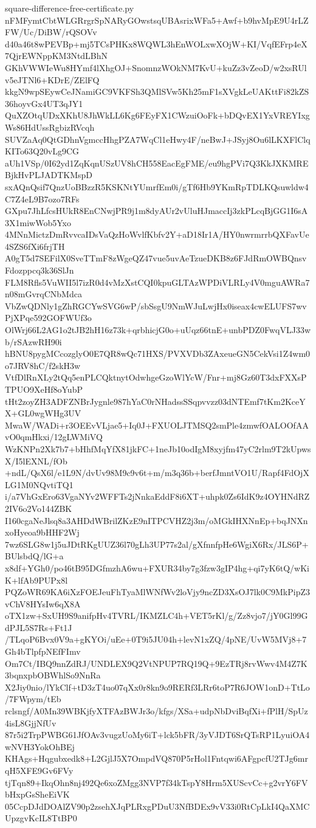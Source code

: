 \documentclass[11pt]{article}
\theoremstyle{definition}
\theoremstyle{remark}
\begin{document}
\begin{filecontents*}[overwrite]{square-difference-free-certificate.py}
nFMFymtCbtWLGRrgrSpNARyGOwstsqUBAsrixWFa5+Awf+b9hvMpE9U4rLZFW/Uc/DiBW/rQSOVv
d40a46t8wPEVBp+mj5TCsPHKx8WQWL3hEnWOLxwXOjW+KI/VqfEFrp4eX7QjrEWNppKM3NtdLBhN
GKhVWWIeWu8HYmf4lXhgOJ+SnomnzWOkNM7KvU+kuZz3vZeoD/w2xsRUlv5eJTNl6+KDrE/ZElFQ
kkgN9wpSEywCeJNamiGC9VKFSh3QMlSVw5Kh25mF1sXVgkLeUAKttFi82kZS36hoyvGx4UT3qJY1
QuXZOtqUDxXKhU8JhWkLL6Kg6FEyFX1CWzuiOoFk+bDQvEX1YxVREYIxgWs86HdUssRgbizRVcqh
SUVZaAq0QtGDhnVgmccHhgPZA7WqCl1eHwy4F/neBwJ+JSyj8Ou6lLKXFlClqKITo63Q20vLg9CG
aUh1VSp/0I62yd1ZqKqnUSzUV8hCH558EacEgFME/eu9hgPVi7Q3KkJXKMREBjkHvPLJADTKMspD
sxAQnQsif7QnzUoBBzzR5KSKNtYUmrfEm0i/gTf6Hb9YKmRpTDLKQsuwldw4C7Z4eL9B7ozo7RFs
GXpu7JhLfcsHUkR8EnCNwjPR9j1m8dyAUr2vUluHJmaccIj3zkPLcqBjGG1I6sA3X1miwWob5Yxo
4MNnMictzDmRvvcaIDsVaQzHoWvlfKbfv2Y+aD18Ir1A/HY0nwrmrrbQXFavUe4SZS6fXi6frjTH
A0gT5d7SEFilX0SveTTmF8zWgeQZ47vue5uvAeTzueDKB8z6FJdRmOWBQnsvFdozppcq3k36SlJn
FLM8Rfls5VuWII5l7izR0d4vMzXstCQI0kpuGLTAzWPDiVLRLy4V0mguAWRa7n08mGvrqCNbMdca
VbZwQDNly1gZhRGCYwSVG6wP/sbSsgU9NmWJuLwjHx0iseax4cwELUFS7wvPjXPqe592GOFWUf3o
OlWrj66L2AG1o2tJB2hH16z73k+qrbhicjG0o+uUqz66tnE+unbPDZ0FwqVLJ33wb/rSAzwRH90i
hBNU8pygMCcozglyO0E7QR8wQc71HXS/PVXVDb3ZAxeueGN5CekVsi1Z4wm0o7JRV8hC/f2skH3w
VtfDlRnXLy2tQq5enPLCQktnytOdwhgeGzoWlYcW/Fnr+mj8Gz60T3dxFXXsPTPUO9XeHf8oYubP
tHt2zoyZH3ADFZNBrJygnle987hYaC0rNHadssSSqpvvzz03dNTEmf7tKm2KceYX+GL0wgWHg3UV
MwaW/WADi+r3OEEvVLjae5+Iq0J+FXUOLJTMSQ2smPle4zmwfOALOOfAAvO0qmHkxi/12gLWMiVQ
WzKNPn2Xk7b7+bHhfMqYfX81jkFC+1neJb10odIgM8xyjfm47yC2rlm9T2kUpwsX/I5lEXNL/fOb
+ndL/QsX6l/e1L9N/dvUv98M9c9v6t+m/m3q36b+berfJmntVO1U/Rapf4FdOjXLG1M0NQvtiTQ1
i/a7VhGxEro63VgaNYv2WFFTs2jNnkaEddF8i6XT+uhpk0Zs6IdK9z4OYHNdRZ2IV6o2Vo144ZBK
I160cgaNeJlsq8a3AHDdWBrilZKzE9nITPCVHZ2j3m/oMGkIHXNnEp+bqJNXnxoHyeoa9bHHF2Wj
7wz6SLG8w1j5uJDtRKgUUZ36l70gLh3UP77s2al/gXfnnfpHe6WgiX6Rx/JLS6P+BUlsbdQ/lG+a
x8df+YGh0/po46tB95DGfmzhA6wu+FXUR34by7g3fzw3gIP4hg+qi7yK6tQ/wKiK+lfAb9PUPx8l
PQZoWR69KA6iXzFOEJeuFhTyaMlWNfWv2loVjy9ncZD3XsOJ7lk0C9MkPipZ3vChV8HYsIw6qX8A
oTX1zw+SxUH9S9anifpHv4TVRL/IKMZLC4h+VET5rKl/g/Zz8vjo7/jY0Gl99GdPJL5S7Rs+Ft1J
/TLqoP6Bvx0V9a+gKYOi/uEe+0T9i5JU04h+levN1xZQ/4pNE/UvW5MVj8+7Gh4bTlpfpNEfFImv
Om7Ct/IBQ9nnZdRJ/UNDLEX9Q2VtNPUP7RQ19Q+9EzTRj8rvWwv4M4Z7K3bqnxpbOBWhlSo9NnRa
X2Jiy0nio/lYkClf+tD3zT4uo07qXx0r8kn9o9RERf3LRr6toP7R6JOW1onD+TtLo/7FWpym/tEb
rclsngf/A0Mn39WBKjfyXTFAzBWJr3o/kfgs/XSa+udpNbDviBqfXi+fPlH/SpUz4isL8GjjNfUv
87r5i2TrpPWBG61JfOAv3vugzUoMy6iT+lck5bFR/3yVJDT6SrQTsRP1LyuiOA4wNVH3YokOhBEj
KHAgs+Hqgubxedk8+L2GjlJ5X7OmpdVQ870P5rHol1Fntqwi6AFgpcfU2TJg6mrqH5XFE9Gv6FVy
tjTqn89+IkqOhn8nj492Qe6xoZMgg3NVP7f34kTspY8Hrm5XUScvCc+g2vrY6FVbHxpGsSheEiVK
05CcpDJdDOAlZV90p2zsehXJqPLRxgPDuU3NfBDEx9vV33i0RtCpLkI4QaXMCUpzgvKcIL8TtBP0

\end{filecontents*}
\end{document}

